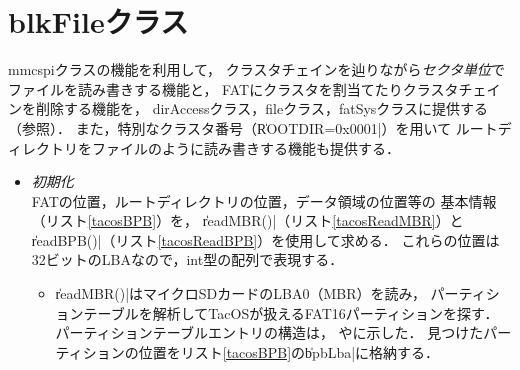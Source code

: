 \section{blkFileクラス}
\label{readBlkFile}
mmcspiクラスの機能を利用して，
クラスタチェインを辿りながら\emph{セクタ単位}でファイルを読み書きする機能と，
FATにクラスタを割当てたりクラスタチェインを削除する機能を，
dirAccessクラス，fileクラス，fatSysクラスに提供する（参照）．
また，特別なクラスタ番号（\|ROOTDIR=0x0001|）を用いて
ルートディレクトリをファイルのように読み書きする機能も提供する．

\begin{itemize}
\item \emph{初期化}\\
  FATの位置，ルートディレクトリの位置，データ領域の位置等の
  基本情報（リスト\ref{tacosBPB}）を，
  \|readMBR()|（リスト\ref{tacosReadMBR}）と
  \|readBPB()|（リスト\ref{tacosReadBPB}）を使用して求める．
  これらの位置は32ビットのLBAなので，int型の配列で表現する．

  

  \begin{itemize}
  \item \|readMBR()|はマイクロSDカードのLBA0（MBR）を読み，
    パーティションテーブルを解析してTacOSが扱えるFAT16パーティションを探す．
    パーティションテーブルエントリの構造は，
    やに示した．
    見つけたパーティションの位置をリスト\ref{tacosBPB}の\|bpbLba|に格納する．
  
    


\end{itemize}
\end{itemize}
